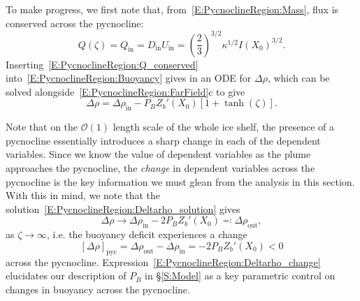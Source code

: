 \documentclass[openacc]{rsproca_new}%
\newcommand{\order}[1]{\mathcal{O}(#1)}
\newcommand{\Pb}{\textit{P}_B}  %
\renewcommand{\in}{\text{in}} %
\newcommand{\out}{\text{out}}
\begin{document}
To make progress, we first note that, from~\eqref{E:PycnoclineRegion:Mass}, flux is conserved across the pycnocline:
\begin{equation}\label{E:PycnoclineRegion:Q_conserved}
Q(\zeta) = Q_{\in} = D_{\in} U_{\in}  =\left(\frac{2}{3}\right)^{3/2} \kappa^{1/2}I(X_0)^{3/2}.
\end{equation}
Inserting~\eqref{E:PycnoclineRegion:Q_conserved} into~\eqref{E:PycnoclineRegion:Buoyancy} gives in an ODE for $\Delta \rho$, which can be solved alongside~\eqref{E:PycnoclineRegion:FarField}c to give
\begin{equation}\label{E:PycnoclineRegion:Deltarho_solution}
\Delta \rho = \Delta \rho_{\in} - \Pb Z_b'(X_0) \left[1 + \tanh(\zeta)\right].
\end{equation} 

Note that on the $\order{1}$ length scale of the whole ice shelf, the presence of a pycnocline essentially introduces a sharp change in each of the dependent variables. Since we know the value of dependent variables as the plume approaches the pycnocline, the \textit{change} in dependent variables across the pycnocline is the key information we must glean from the analysis in this section. With this in mind, we note that the solution~\eqref{E:PycnoclineRegion:Deltarho_solution} gives
\begin{equation}\label{E:PycnoclineRegion:Deltarho_limit}
\Delta \rho \to \Delta \rho_{\in} - 2 \Pb Z_b'(X_0)  \eqcolon \Delta \rho_\out,
\end{equation}
as $\zeta \to \infty$, i.e. the buoyancy deficit experiences a change
\begin{equation}\label{E:PycnoclineRegion:Deltarho_change}
\left[\Delta \rho\right]_{\text{pyc}} = \Delta \rho_\out - \Delta \rho_\in = - 2 \Pb Z_b'(X_0) < 0
\end{equation}
across the pycnocline. Expression~\eqref{E:PycnoclineRegion:Deltarho_change} elucidates our description of $\Pb$ in \S\ref{S:Model} as a key parametric control on changes in buoyancy across the pycnocline.
\end{document}
